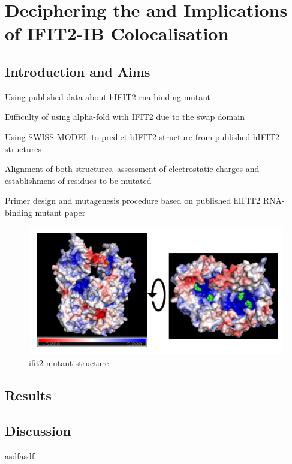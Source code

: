 \chapter{Deciphering the and Implications of IFIT2-IB Colocalisation}
\section{Introduction and Aims}
Using published data about hIFIT2 rna-binding mutant

Difficulty of using alpha-fold with IFIT2 due to the swap domain

Using SWISS-MODEL to predict bIFIT2 structure from published hIFIT2 structures

Alignment of both structures, assessment of electrostatic charges and establishment of residues to be mutated

Primer design and mutagenesis procedure based on published hIFIT2 RNA-binding mutant paper

\begin{figure}
    \centering
    \includegraphics[width=1\linewidth]{10. Chapter 5/Figs/00. Introduction/00. structure.png}
    \caption[ifit2 mutant structure]{ifit2 mutant structure}
    \label{ifit2 mutant structure}
\end{figure}

\section{Results}







\section{Discussion}
asdfasdf